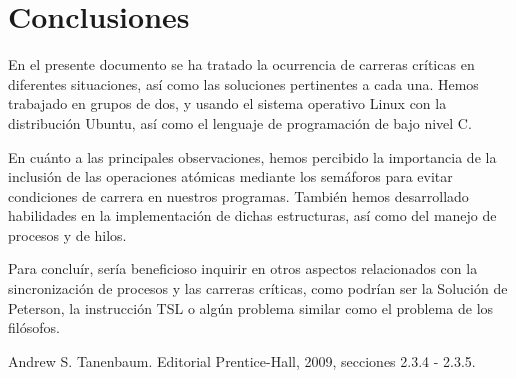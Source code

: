 \documentclass[a4paper,twocolumn]{article}
\begin{document}
\section{Conclusiones}


En el presente documento se ha tratado la ocurrencia de carreras críticas en diferentes situaciones, así como las soluciones pertinentes a cada una. Hemos trabajado en grupos de dos, y usando el sistema operativo Linux con la distribución Ubuntu, así como el lenguaje de programación de bajo nivel C.

En cuánto a las principales observaciones, hemos percibido la importancia de la inclusión de las operaciones atómicas mediante los semáforos para evitar condiciones de carrera en nuestros programas. También hemos desarrollado habilidades en la implementación de dichas estructuras, así como del manejo de procesos y de hilos.

Para concluír, sería beneficioso inquirir en otros aspectos relacionados con la sincronización de procesos y las carreras críticas, como podrían ser la Solución de Peterson, la instrucción TSL o algún problema similar como el problema de los filósofos.

	
\begin{thebibliography}{99} %
		
    Andrew S. Tanenbaum. 
	\newblock Editorial Prentice-Hall, 2009, secciones 2.3.4 - 2.3.5.
		
\end{thebibliography}
	
	
\end{document}
